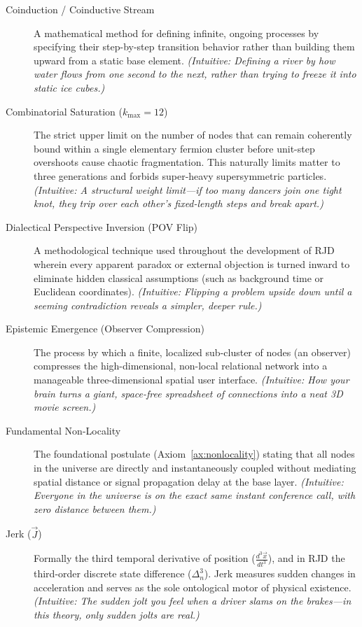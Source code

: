 \documentclass[11pt,a4paper]{article}
\theoremstyle{plain}
\theoremstyle{definition}
\theoremstyle{remark}
\newcommand{\Jerk}{\vec{J}}
\newcommand{\Pos}{\vec{x}}
\begin{document}
\begin{description}
    \item[Coinduction / Coinductive Stream] A mathematical method for defining infinite, ongoing processes by specifying their step-by-step transition behavior rather than building them upward from a static base element. \emph{(Intuitive: Defining a river by how water flows from one second to the next, rather than trying to freeze it into static ice cubes.)}

    \item[Combinatorial Saturation ($k_{\max} = 12$)] The strict upper limit on the number of nodes that can remain coherently bound within a single elementary fermion cluster before unit-step overshoots cause chaotic fragmentation. This naturally limits matter to three generations and forbids super-heavy supersymmetric particles. \emph{(Intuitive: A structural weight limit—if too many dancers join one tight knot, they trip over each other's fixed-length steps and break apart.)}

    \item[Dialectical Perspective Inversion (POV Flip)] A methodological technique used throughout the development of RJD wherein every apparent paradox or external objection is turned inward to eliminate hidden classical assumptions (such as background time or Euclidean coordinates). \emph{(Intuitive: Flipping a problem upside down until a seeming contradiction reveals a simpler, deeper rule.)}

    \item[Epistemic Emergence (Observer Compression)] The process by which a finite, localized sub-cluster of nodes (an observer) compresses the high-dimensional, non-local relational network into a manageable three-dimensional spatial user interface. \emph{(Intuitive: How your brain turns a giant, space-free spreadsheet of connections into a neat 3D movie screen.)}

    \item[Fundamental Non-Locality] The foundational postulate (Axiom~\ref{ax:nonlocality}) stating that all nodes in the universe are directly and instantaneously coupled without mediating spatial distance or signal propagation delay at the base layer. \emph{(Intuitive: Everyone in the universe is on the exact same instant conference call, with zero distance between them.)}

    \item[Jerk ($\Jerk$)] Formally the third temporal derivative of position ($\frac{d^3\Pos}{dt^3}$), and in RJD the third-order discrete state difference ($\Delta^3_n$). Jerk measures sudden changes in acceleration and serves as the sole ontological motor of physical existence. \emph{(Intuitive: The sudden jolt you feel when a driver slams on the brakes—in this theory, only sudden jolts are real.)}


\end{description}
\end{document}
